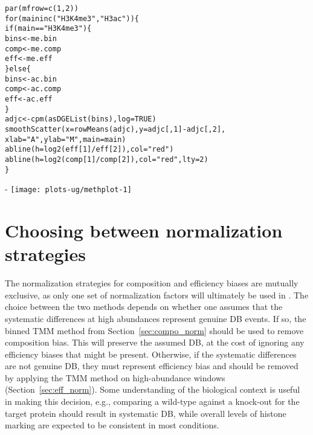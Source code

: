 \documentclass{report}\usepackage[]{graphicx}\usepackage[usenames,dvipsnames]{color}
\makeatletter
\def\maxwidth{ %
  \ifdim\Gin@nat@width>\linewidth
    \linewidth
  \else
    \Gin@nat@width
  \fi
}
\newcommand{\hlnum}[1]{\textcolor[rgb]{0.816,0.125,0.439}{#1}}%
\newcommand{\hlstr}[1]{\textcolor[rgb]{0.251,0.627,0.251}{#1}}%
\newcommand{\hlopt}[1]{\textcolor[rgb]{0,0,0}{#1}}%
\newcommand{\hlstd}[1]{\textcolor[rgb]{0.251,0.251,0.251}{#1}}%
\newcommand{\hlkwa}[1]{\textcolor[rgb]{0.125,0.125,0.941}{#1}}%
\newcommand{\hlkwb}[1]{\textcolor[rgb]{0,0,0}{#1}}%
\newcommand{\hlkwc}[1]{\textcolor[rgb]{0.251,0.251,0.251}{#1}}%
\newcommand{\hlkwd}[1]{\textcolor[rgb]{0.878,0.439,0.125}{#1}}%
\newenvironment{knitrout}{}{} %
\makeatother
\begin{document}
\begin{knitrout}
\color{fgcolor}\begin{kframe}
\begin{alltt}
\hlkwd{par}\hlstd{(}\hlkwc{mfrow}\hlstd{=}\hlkwd{c}\hlstd{(}\hlnum{1}\hlstd{,}\hlnum{2}\hlstd{))}
\hlkwa{for} \hlstd{(main} \hlkwa{in} \hlkwd{c}\hlstd{(}\hlstr{"H3K4me3"}\hlstd{,} \hlstr{"H3ac"}\hlstd{)) \{}
    \hlkwa{if} \hlstd{(main}\hlopt{==}\hlstr{"H3K4me3"}\hlstd{) \{}
        \hlstd{bins} \hlkwb{<-} \hlstd{me.bin}
        \hlstd{comp} \hlkwb{<-} \hlstd{me.comp}
        \hlstd{eff} \hlkwb{<-} \hlstd{me.eff}
    \hlstd{\}} \hlkwa{else} \hlstd{\{}
        \hlstd{bins} \hlkwb{<-} \hlstd{ac.bin}
        \hlstd{comp} \hlkwb{<-} \hlstd{ac.comp}
        \hlstd{eff} \hlkwb{<-} \hlstd{ac.eff}
    \hlstd{\}}
    \hlstd{adjc} \hlkwb{<-} \hlkwd{cpm}\hlstd{(}\hlkwd{asDGEList}\hlstd{(bins),} \hlkwc{log}\hlstd{=}\hlnum{TRUE}\hlstd{)}
    \hlkwd{smoothScatter}\hlstd{(}\hlkwc{x}\hlstd{=}\hlkwd{rowMeans}\hlstd{(adjc),} \hlkwc{y}\hlstd{=adjc[,}\hlnum{1}\hlstd{]}\hlopt{-}\hlstd{adjc[,}\hlnum{2}\hlstd{],}
                  \hlkwc{xlab}\hlstd{=}\hlstr{"A"}\hlstd{,} \hlkwc{ylab}\hlstd{=}\hlstr{"M"}\hlstd{,} \hlkwc{main}\hlstd{=main)}
    \hlkwd{abline}\hlstd{(}\hlkwc{h}\hlstd{=}\hlkwd{log2}\hlstd{(eff[}\hlnum{1}\hlstd{]}\hlopt{/}\hlstd{eff[}\hlnum{2}\hlstd{]),} \hlkwc{col}\hlstd{=}\hlstr{"red"}\hlstd{)}
    \hlkwd{abline}\hlstd{(}\hlkwc{h}\hlstd{=}\hlkwd{log2}\hlstd{(comp[}\hlnum{1}\hlstd{]}\hlopt{/}\hlstd{comp[}\hlnum{2}\hlstd{]),} \hlkwc{col}\hlstd{=}\hlstr{"red"}\hlstd{,} \hlkwc{lty}\hlstd{=}\hlnum{2}\hlstd{)}
\hlstd{\}}
\end{alltt}
\end{kframe}\begin{adjustwidth}{0mm}{-\fltoffset}
\texttt{[image: plots-ug/methplot-1]} \end{adjustwidth}
\end{knitrout}

\section{Choosing between normalization strategies}
\label{sec:normchoice}
The normalization strategies for composition and efficiency biases are mutually exclusive, as only one set of normalization factors will ultimately be used in .
The choice between the two methods depends on whether one assumes that the systematic differences at high abundances represent genuine DB events.
If so, the binned TMM method from Section~\ref{sec:compo_norm} should be used to remove composition bias.
This will preserve the assumed DB, at the cost of ignoring any efficiency biases that might be present.
Otherwise, if the systematic differences are not genuine DB, they must represent efficiency bias and should be removed by applying the TMM method on high-abundance windows (Section~\ref{sec:eff_norm}).
Some understanding of the biological context is useful in making this decision, e.g., comparing a wild-type against a knock-out for the target protein should result in systematic DB, while overall levels of histone marking are expected to be consistent in most conditions.
\end{document}
